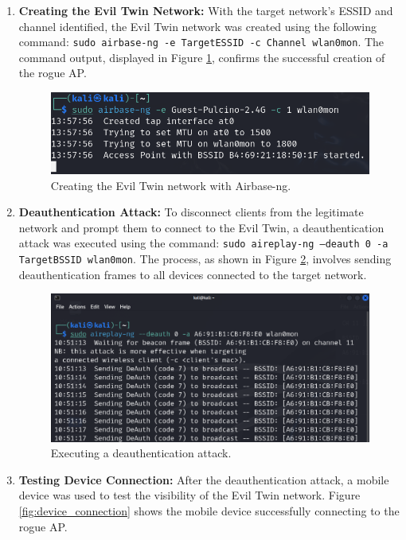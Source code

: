 \begin{enumerate}
    \item \textbf{Creating the Evil Twin Network:} With the target network's ESSID and channel identified, the Evil Twin network was created using the following command: 
    \texttt{sudo airbase-ng -e TargetESSID -c Channel wlan0mon}. 
    The command output, displayed in Figure \ref{fig:evil_twin_creation}, confirms the successful creation of the rogue AP.
    
    \begin{figure}[h!]
        \centering
        \includegraphics[width=0.8\linewidth]{images/evil_twin_creation.png}
        \caption{Creating the Evil Twin network with Airbase-ng.}
        \label{fig:evil_twin_creation}
    \end{figure}

    \item \textbf{Deauthentication Attack:} To disconnect clients from the legitimate network and prompt them to connect to the Evil Twin, a deauthentication attack was executed using the command:
    \texttt{sudo aireplay-ng --deauth 0 -a TargetBSSID wlan0mon}. 
    The process, as shown in Figure \ref{fig:deauth_attack}, involves sending deauthentication frames to all devices connected to the target network.
    
    \begin{figure}[h!]
        \centering
        \includegraphics[width=0.8\linewidth]{images/dauth.png}
        \caption{Executing a deauthentication attack.}
        \label{fig:deauth_attack}
    \end{figure}

    \item \textbf{Testing Device Connection:} After the deauthentication attack, a mobile device was used to test the visibility of the Evil Twin network. Figure \ref{fig:device_connection} shows the mobile device successfully connecting to the rogue AP.
    

\end{enumerate}
